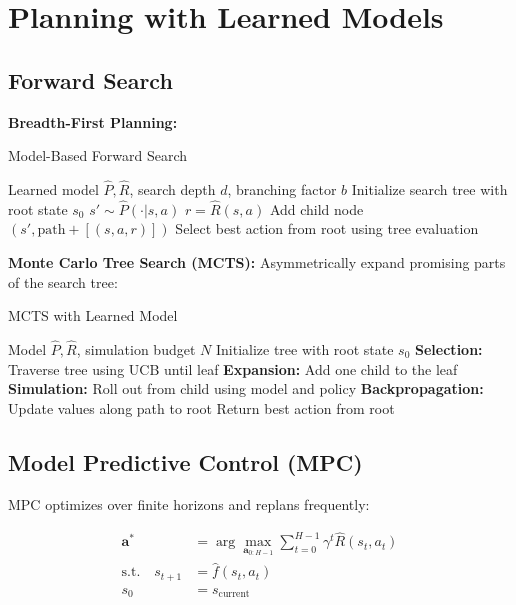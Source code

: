 \section{Planning with Learned Models}

\subsection{Forward Search}

\textbf{Breadth-First Planning:}
\begin{algorithm}
\caption{Model-Based Forward Search}
\begin{algorithmic}
\REQUIRE Learned model $\hat{P}, \hat{R}$, search depth $d$, branching factor $b$
\STATE Initialize search tree with root state $s_0$
            \STATE $s' \sim \hat{P}(\cdot|s, a)$
            \STATE $r = \hat{R}(s, a)$
            \STATE Add child node $(s', \text{path} + [(s,a,r)])$
        \ENDFOR
    \ENDFOR
\ENDFOR
\STATE Select best action from root using tree evaluation
\end{algorithmic}
\end{algorithm}

\textbf{Monte Carlo Tree Search (MCTS):}
Asymmetrically expand promising parts of the search tree:

\begin{algorithm}
\caption{MCTS with Learned Model}
\begin{algorithmic}
\REQUIRE Model $\hat{P}, \hat{R}$, simulation budget $N$
\STATE Initialize tree with root state $s_0$
    \STATE \textbf{Selection:} Traverse tree using UCB until leaf
    \STATE \textbf{Expansion:} Add one child to the leaf
    \STATE \textbf{Simulation:} Roll out from child using model and policy
    \STATE \textbf{Backpropagation:} Update values along path to root
\ENDFOR
\STATE Return best action from root
\end{algorithmic}
\end{algorithm}

\subsection{Model Predictive Control (MPC)}

MPC optimizes over finite horizons and replans frequently:

\begin{align}
\mathbf{a}^* &= \arg\max_{\mathbf{a}_{0:H-1}} \sum_{t=0}^{H-1} \gamma^t \hat{R}(s_t, a_t) \\
\text{s.t.} \quad s_{t+1} &= \hat{f}(s_t, a_t) \\
s_0 &= s_{\text{current}}
\end{align}


